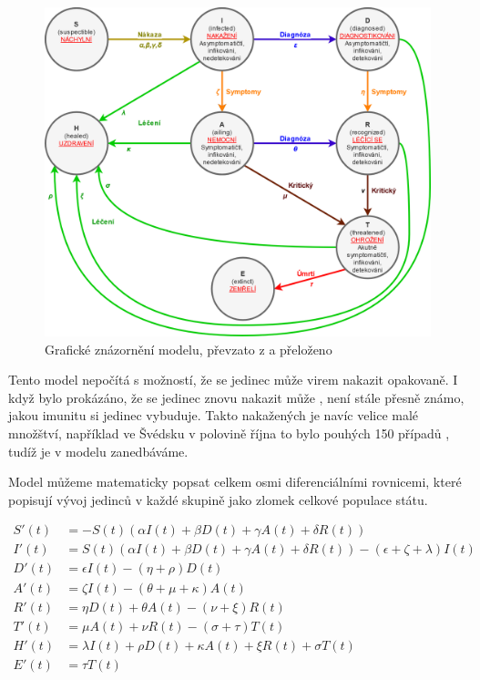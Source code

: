 \documentclass[a4paper,11pt]{article}
\begin{document}
		\begin{figure}[H]
			\caption{Grafické znázornění modelu, převzato z \cite{source} a přeloženo}
			\label{fig1}
			\centering
			\includegraphics[scale=0.25]{model.png}
		\end{figure}
	
		Tento model nepočítá s možností, že se jedinec může virem nakazit opakovaně. I když bylo prokázáno, že se jedinec znovu nakazit může \cite{reinfection}, není stále přesně známo, jakou imunitu si jedinec vybuduje. Takto nakažených je navíc velice malé množštví, například ve Švédsku v polovině října to bylo pouhých 150 případů \cite{reincases}, tudíž je v modelu zanedbáváme.
		
		Model můžeme matematicky popsat celkem osmi diferenciálními rovnicemi, které popisují vývoj jedinců v každé skupině jako zlomek celkové populace státu.
		
		\begin{align}
			S'(t) &= - S(t) (\alpha I(t) + \beta D(t) + \gamma A(t) + \delta R(t))\\
			I'(t) &= S(t) (\alpha I(t) + \beta D(t) + \gamma A(t) + \delta R(t)) - (\epsilon + \zeta + \lambda)I(t)\\
			D'(t) &= \epsilon I(t) - (\eta + \rho) D(t)\\
			A'(t) &= \zeta I(t) - (\theta + \mu + \kappa) A(t)\\
			R'(t) &= \eta D(t) + \theta A(t) - (\nu + \xi) R(t)\\
			T'(t) &= \mu A(t) + \nu R(t) - (\sigma + \tau) T(t)\\
			H'(t) &= \lambda I(t) + \rho D(t) + \kappa A(t) + \xi R(t) + \sigma T(t)\\
			E'(t) &= \tau T(t)
		\end{align}
	
\end{document}
